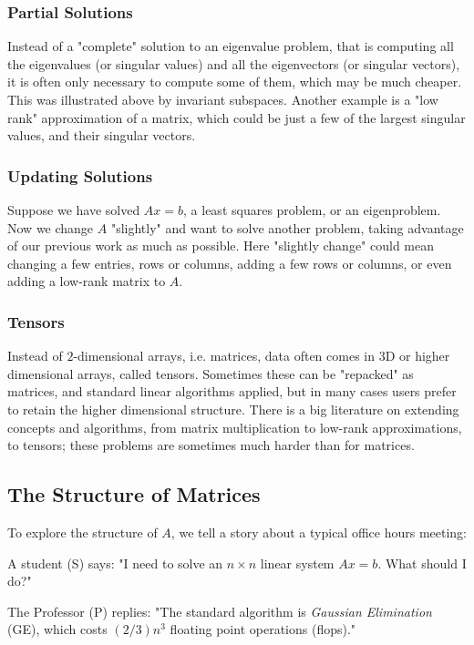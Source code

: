 \documentclass[11pt]{article}
\numberwithin{equation}{section}
\begin{document}
\subsubsection{Partial Solutions}
Instead of a "complete" solution to an eigenvalue problem, that is computing all the eigenvalues (or singular values) and all the eigenvectors 
(or singular vectors), it is often only necessary to compute some of them, which may be much cheaper. This was illustrated above by invariant subspaces. 
Another example is a "low rank" approximation of a matrix, which could be just a few of the largest singular values, and their singular vectors.

\subsubsection{Updating Solutions}
Suppose we have solved $Ax=b$, a least squares problem, or an eigenproblem. Now we change $A$ "slightly" and want to solve another problem, 
taking advantage of our previous work as much as possible. Here "slightly change" could mean changing a few entries, rows or columns, 
adding a few rows or columns, or even adding a low-rank matrix to $A$.

\subsubsection{Tensors}
Instead of $2$-dimensional arrays, i.e. matrices, data often comes in 3D or higher dimensional arrays, called tensors.
Sometimes these can be "repacked" as matrices, and standard linear algorithms applied, but in many cases users prefer to retain the higher dimensional structure. 
There is a big literature on extending concepts and algorithms, from matrix multiplication to low-rank approximations, to tensors; 
these problems are sometimes much harder than for matrices.

\subsection{The Structure of Matrices}
To explore the structure of $A$, we tell a story about a typical office hours meeting: 

A student (S) says: "I need to solve an $n \times n$ linear system $Ax=b$. What should I do?"

The Professor (P) replies: "The standard algorithm is \textit{Gaussian Elimination} (GE), which costs $(2/3)n^3$ floating point operations (flops)."
\end{document}
